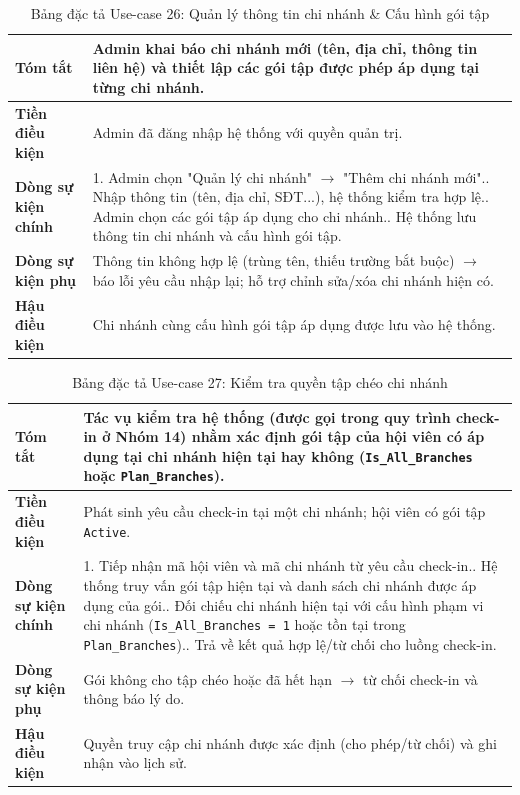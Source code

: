 \documentclass[a4paper,12pt]{article}
\begin{document}
\begin{table}[H]\centering\footnotesize
\begin{tabularx}{\textwidth}{|L{3.2cm}|Y|}
\hline \textbf{Tóm tắt} & Admin khai báo chi nhánh mới (tên, địa chỉ, thông tin liên hệ) và thiết lập các gói tập được phép áp dụng tại từng chi nhánh. \\ \hline
\textbf{Tiền điều kiện} & Admin đã đăng nhập hệ thống với quyền quản trị. \\ \hline
\textbf{Dòng sự kiện chính} & 1. Admin chọn "Quản lý chi nhánh" $\rightarrow$ "Thêm chi nhánh mới".. Nhập thông tin (tên, địa chỉ, SĐT...), hệ thống kiểm tra hợp lệ.. Admin chọn các gói tập áp dụng cho chi nhánh.. Hệ thống lưu thông tin chi nhánh và cấu hình gói tập. \\ \hline
\textbf{Dòng sự kiện phụ} & Thông tin không hợp lệ (trùng tên, thiếu trường bắt buộc) $\rightarrow$ báo lỗi yêu cầu nhập lại; hỗ trợ chỉnh sửa/xóa chi nhánh hiện có. \\ \hline
\textbf{Hậu điều kiện} & Chi nhánh cùng cấu hình gói tập áp dụng được lưu vào hệ thống. \\ \hline
\end{tabularx}
\caption{Bảng đặc tả Use-case 26: Quản lý thông tin chi nhánh \& Cấu hình gói tập}
\end{table}

\begin{table}[H]\centering\footnotesize
\begin{tabularx}{\textwidth}{|L{3.2cm}|Y|}
\hline \textbf{Tóm tắt} & Tác vụ kiểm tra hệ thống (được gọi trong quy trình check-in ở Nhóm 14) nhằm xác định gói tập của hội viên có áp dụng tại chi nhánh hiện tại hay không (\texttt{Is\_All\_Branches} hoặc \texttt{Plan\_Branches}). \\ \hline
\textbf{Tiền điều kiện} & Phát sinh yêu cầu check-in tại một chi nhánh; hội viên có gói tập \texttt{Active}. \\ \hline
\textbf{Dòng sự kiện chính} & 1. Tiếp nhận mã hội viên và mã chi nhánh từ yêu cầu check-in.. Hệ thống truy vấn gói tập hiện tại và danh sách chi nhánh được áp dụng của gói.. Đối chiếu chi nhánh hiện tại với cấu hình phạm vi chi nhánh (\texttt{Is\_All\_Branches = 1} hoặc tồn tại trong \texttt{Plan\_Branches}).. Trả về kết quả hợp lệ/từ chối cho luồng check-in. \\ \hline
\textbf{Dòng sự kiện phụ} & Gói không cho tập chéo hoặc đã hết hạn $\rightarrow$ từ chối check-in và thông báo lý do. \\ \hline
\textbf{Hậu điều kiện} & Quyền truy cập chi nhánh được xác định (cho phép/từ chối) và ghi nhận vào lịch sử. \\ \hline
\end{tabularx}
\caption{Bảng đặc tả Use-case 27: Kiểm tra quyền tập chéo chi nhánh}
\end{table}
\end{document}
